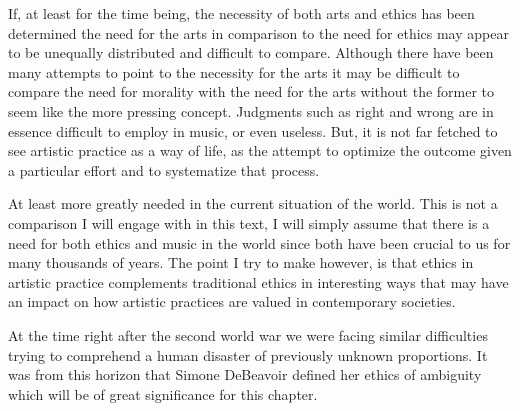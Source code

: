 \documentclass[11pt]{article}
\begin{document}
If, at least for the time being, the necessity of both arts and ethics has been determined the need for the arts in comparison to the need for ethics may appear to be unequally distributed and difficult to compare. Although there have been many attempts to point to the necessity for the arts it may be difficult to compare the need for morality with the need for the arts without the former to seem like the more pressing concept. Judgments such as right and wrong are in essence difficult to employ in music, or even useless. But, it is not far fetched to see artistic practice as a way of life, as the attempt to optimize the outcome given a particular effort and to systematize that process.

At least more greatly needed in the current situation of the world. This is not a comparison I will engage with in this text, I will simply assume that there is a need for both ethics and music in the world since both have been crucial to us for many thousands of years. The point I try to make however, is that ethics in artistic practice complements traditional ethics in interesting ways that may have an impact on how artistic practices are valued in contemporary societies.

At the time right after the second world war we were facing similar difficulties trying to comprehend a human disaster of previously unknown proportions. It was from this horizon that Simone DeBeavoir defined her ethics of ambiguity which will be of great significance for this chapter.
\end{document}
